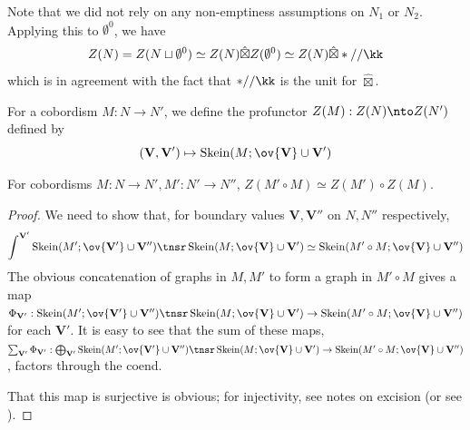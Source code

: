 \documentclass[12pt]{article}
\newcommand{\empt}[1]{{\emptyset^{#1}}}
\newcommand{\VV}{{\mathbf{V}}}
\DeclareMathOperator{\Skein}{Skein}
\newcommand{\hatbox}{{\hat{\boxtimes}}}
\begin{document}
Note that we did not rely on any non-emptiness assumptions
on $N_1$ or $N_2$.
Applying this to $\empt{0}$,
we have
\[
Z(N) = Z(N \sqcup \empt{0}) \simeq Z(N) \hatbox Z(\empt{0})
\simeq Z(N) \hatbox *//\kk
\]
which is in agreement with the fact that
$*//\kk$ is the unit for $\hatbox$.


\begin{definition}
For a cobordism $M : N \to N'$,
we define the profunctor
$Z(M): Z(N) \nto Z(N')$
defined by
\[
(\VV, \VV') \mapsto \Skein(M; \ov{\VV} \cup \VV')
\]
\end{definition}

\begin{proposition}
\label{p:1-cobord-compose}
For cobordisms $M: N \to N', M': N' \to N''$,
$Z(M' \circ M) \simeq Z(M') \circ Z(M)$.
\end{proposition}

\begin{proof}
We need to show that, for boundary values
$\VV,\VV''$ on $N,N''$ respectively,
\[
\int^{\VV'} \Skein(M';\ov{\VV'} \cup \VV'')
\tnsr \Skein(M; \ov{\VV} \cup \VV')
\simeq \Skein(M' \circ M; \ov{\VV} \cup \VV'')
\]
The obvious concatenation of graphs
in $M,M'$ to form a graph in $M' \circ M$
gives a map
$\Phi_{\VV'}: \Skein(M';\ov{\VV'} \cup \VV'')
\tnsr \Skein(M; \ov{\VV} \cup \VV')
\to \Skein(M' \circ M; \ov{\VV} \cup \VV'')$
for each $\VV'$.
It is easy to see that the sum of these maps,
$\sum_{\VV'} \Phi_{\VV'}:
\bigoplus_{\VV'} \Skein(M';\ov{\VV'} \cup \VV'')
\tnsr \Skein(M; \ov{\VV} \cup \VV')
\to \Skein(M' \circ M; \ov{\VV} \cup \VV'')$,
factors through the coend.

That this map is surjective is obvious;
for injectivity, see notes on excision
(or see \cite{KT}).
\end{proof}


%
%
%
\end{document}
